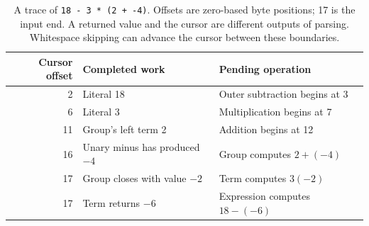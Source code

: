 \begin{table}[htbp]
  \centering
  \begin{tabular}{r l l}
    \toprule
    Cursor offset & Completed work                & Pending operation             \\
    \midrule
    2             & Literal 18                    & Outer subtraction begins at 3 \\
    6             & Literal 3                     & Multiplication begins at 7    \\
    11            & Group's left term 2           & Addition begins at 12         \\
    16            & Unary minus has produced $-4$ & Group computes $2+(-4)$       \\
    17            & Group closes with value $-2$  & Term computes $3(-2)$         \\
    17            & Term returns $-6$             & Expression computes $18-(-6)$ \\
    \bottomrule
  \end{tabular}
  \caption{A trace of \texttt{18 - 3 * (2 + -4)}. Offsets are zero-based byte positions; 17 is the input end. A returned value and the cursor are different outputs of parsing. Whitespace skipping can advance the cursor between these boundaries.}
  \label{tab:revision-expression-trace}
\end{table}
